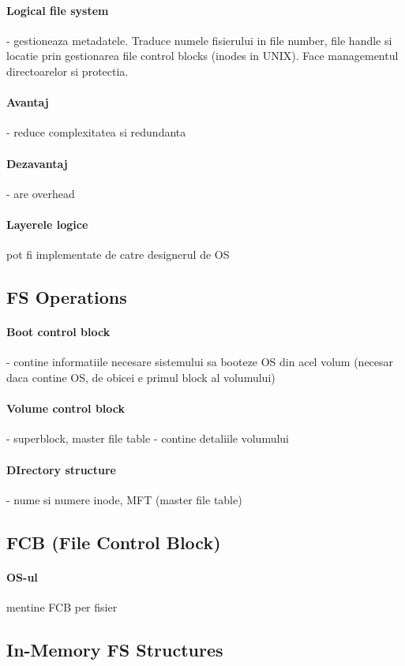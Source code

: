\documentclass{article}
\begin{document}
\paragraph*{Logical file system} - gestioneaza metadatele. Traduce numele fisierului in file number, file handle si locatie prin gestionarea file control blocks (inodes in UNIX). Face managementul directoarelor si protectia.
\paragraph*{Avantaj} - reduce complexitatea si redundanta
\paragraph*{Dezavantaj} - are overhead
\paragraph*{Layerele logice} pot fi implementate de catre designerul de OS

\subsection*{FS Operations}
\paragraph*{Boot control block} - contine informatiile necesare sistemului sa booteze OS din acel volum (necesar daca contine OS, de obicei e primul block al volumului)
\paragraph*{Volume control block} - superblock, master file table - contine detaliile volumului
\paragraph*{DIrectory structure} - nume si numere inode, MFT (master file table)

\subsection*{FCB (File Control Block)}
\paragraph*{OS-ul} mentine FCB per fisier

\subsection*{In-Memory FS Structures}
\end{document}

